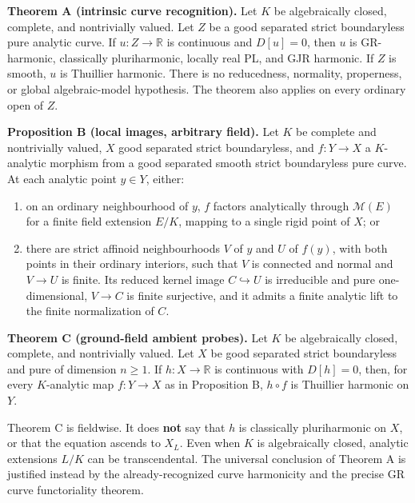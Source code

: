\documentclass[
  11pt,
]{article}
\providecommand{\tightlist}{%
  \setlength{\itemsep}{0pt}\setlength{\parskip}{0pt}}
\begin{document}
\textbf{Theorem A (intrinsic curve recognition).} Let \(K\) be
algebraically closed, complete, and nontrivially valued. Let \(Z\) be a
good separated strict boundaryless pure analytic curve. If
\(u:Z\to\mathbb R\) is continuous and \(D[u]=0\), then \(u\) is
GR-harmonic, classically pluriharmonic, locally real PL, and GJR
harmonic. If \(Z\) is smooth, \(u\) is Thuillier harmonic. There is no
reducedness, normality, properness, or global algebraic-model
hypothesis. The theorem also applies on every ordinary open of \(Z\).

\textbf{Proposition B (local images, arbitrary field).} Let \(K\) be
complete and nontrivially valued, \(X\) good separated strict
boundaryless, and \(f:Y\to X\) a \(K\)-analytic morphism from a good
separated smooth strict boundaryless pure curve. At each analytic point
\(y\in Y\), either:

\begin{enumerate}
\def\labelenumi{\arabic{enumi}.}
\tightlist
\item
  on an ordinary neighbourhood of \(y\), \(f\) factors analytically
  through \(\mathcal M(E)\) for a finite field extension \(E/K\),
  mapping to a single rigid point of \(X\); or
\item
  there are strict affinoid neighbourhoods \(V\) of \(y\) and \(U\) of
  \(f(y)\), with both points in their ordinary interiors, such that
  \(V\) is connected and normal and \(V\to U\) is finite. Its reduced
  kernel image \(C\hookrightarrow U\) is irreducible and pure
  one-dimensional, \(V\to C\) is finite surjective, and it admits a
  finite analytic lift to the finite normalization of \(C\).
\end{enumerate}

\textbf{Theorem C (ground-field ambient probes).} Let \(K\) be
algebraically closed, complete, and nontrivially valued. Let \(X\) be
good separated strict boundaryless and pure of dimension \(n\geq1\). If
\(h:X\to\mathbb R\) is continuous with \(D[h]=0\), then, for every
\(K\)-analytic map \(f:Y\to X\) as in Proposition B, \(h\circ f\) is
Thuillier harmonic on \(Y\).

Theorem C is fieldwise. It does \textbf{not} say that \(h\) is
classically pluriharmonic on \(X\), or that the equation ascends to
\(X_L\). Even when \(K\) is algebraically closed, analytic extensions
\(L/K\) can be transcendental. The universal conclusion of Theorem A is
justified instead by the already-recognized curve harmonicity and the
precise GR curve functoriality theorem.
\end{document}
